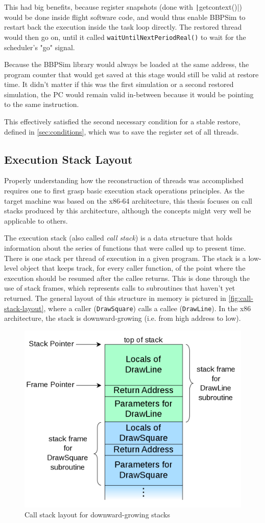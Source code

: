 This had big benefits, because register snapshots (done with \texttt|getcontext()|) would be done inside flight software code, and would thus enable BBPSim to restart back the execution inside the task loop directly. The restored thread would then go on, until it called \texttt{waitUntilNextPeriodReal()} to wait for the scheduler's "go" signal.

Because the \gls{BBPSim} library would always be loaded at the same address, the program counter that would get saved at this stage would still be valid at restore time. It didn't matter if this was the first simulation or a second restored simulation, the PC would remain valid in-between because it would be pointing to the same instruction. 

This effectively satisfied the second necessary condition for a stable restore, defined in \autoref{sec:conditions}, which was to save the register set of all threads.

\subsection*{Execution Stack Layout}
Properly understanding how the reconstruction of threads was accomplished requires one to first grasp basic execution stack operations principles. As the target machine was based on the x86-64 architecture, this thesis focuses on call stacks produced by this architecture, although the concepts might very well be applicable to others.

The execution stack (also called \textit{call stack}) is a data structure that holds information about the series of functions that were called up to present time. There is one stack per thread of execution in a given program. The stack is a low-level object that keeps track, for every caller function, of the point where the execution should be resumed after the callee returns. This is done through the use of stack frames, which represents calls to subroutines that haven't yet returned. The general layout of this structure in memory is pictured in \autoref{fig:call-stack-layout}, where a caller (\texttt{DrawSquare}) calls a callee (\texttt{DrawLine}). In the x86 architecture, the stack is downward-growing (i.e. from high address to low).

\begin{figure}[htbp]
	\centering
	\includegraphics[width=.6\linewidth,keepaspectratio]{art/call-stack-layout.png}
	\caption{Call stack layout for downward-growing stacks\cite{online:stack-img}}
	\label{fig:call-stack-layout}
\end{figure}

